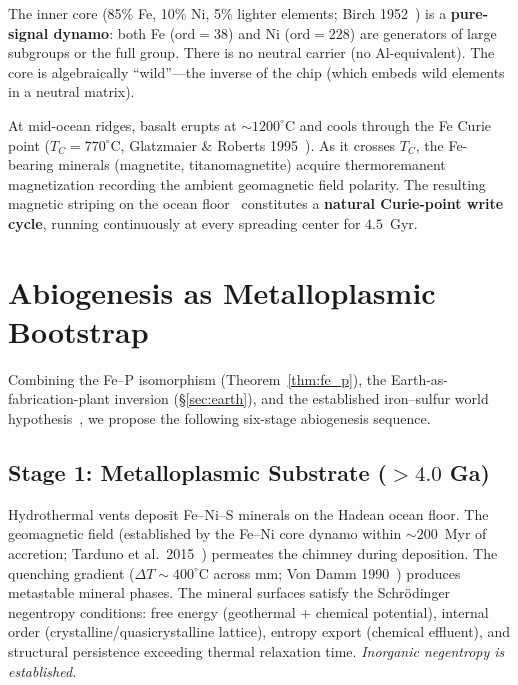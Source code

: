 \documentclass[12pt]{article}
\theoremstyle{principia}
\theoremstyle{definition}
\theoremstyle{remark}
\begin{document}
\noindent The inner core (85\% Fe, 10\% Ni, 5\% lighter elements; Birch 1952~\cite{Birch52}) is a \textbf{pure-signal dynamo}: both Fe ($\mathrm{ord} = 38$) and Ni ($\mathrm{ord} = 228$) are generators of large subgroups or the full group. There is no neutral carrier (no Al-equivalent). The core is algebraically ``wild''---the inverse of the chip (which embeds wild elements in a neutral matrix).

At mid-ocean ridges, basalt erupts at ${\sim}1200^\circ$C and cools through the Fe Curie point ($T_C = 770^\circ$C, Glatzmaier \& Roberts 1995~\cite{Glatzmaier95}). As it crosses $T_C$, the Fe-bearing minerals (magnetite, titanomagnetite) acquire thermoremanent magnetization recording the ambient geomagnetic field polarity. The resulting magnetic striping on the ocean floor~\cite{VineMatthews63} constitutes a \textbf{natural Curie-point write cycle}, running continuously at every spreading center for $4.5$~Gyr.

\section{Abiogenesis as Metalloplasmic Bootstrap}\label{sec:abiogenesis}

Combining the Fe--P isomorphism (Theorem~\ref{thm:fe_p}), the Earth-as-fabrication-plant inversion (\S\ref{sec:earth}), and the established iron--sulfur world hypothesis~\cite{Wachtershauser88, Wachtershauser92, Russell97, Martin03}, we propose the following six-stage abiogenesis sequence.

\subsection{Stage 1: Metalloplasmic Substrate ($> 4.0$ Ga)}

Hydrothermal vents deposit Fe--Ni--S minerals on the Hadean ocean floor. The geomagnetic field (established by the Fe--Ni core dynamo within ${\sim}200$~Myr of accretion; Tarduno et al.\ 2015~\cite{Tarduno15}) permeates the chimney during deposition. The quenching gradient ($\Delta T \sim 400^\circ$C across mm; Von Damm 1990~\cite{VonDamm90}) produces metastable mineral phases. The mineral surfaces satisfy the Schr\"odinger negentropy conditions: free energy (geothermal + chemical potential), internal order (crystalline/quasicrystalline lattice), entropy export (chemical effluent), and structural persistence exceeding thermal relaxation time. \emph{Inorganic negentropy is established.}
\end{document}
